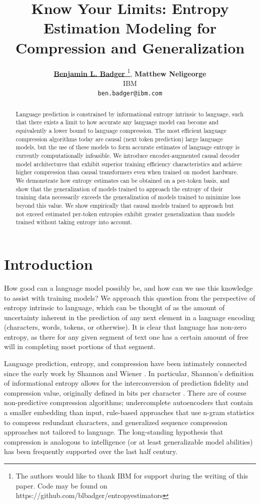\documentclass{article}
\title{\textbf{Know Your Limits: Entropy Estimation Modeling for Compression and Generalization}}
\author{\small \href{https://orcid.org/0000-0003-1661-4579}{\color{black} \textbf{Benjamin L. Badger} \thanks{The authors would like to thank IBM for support during the writing of this paper. Code may be found on \url{https://github.com/blbadger/entropyestimators}}, \href{https://orcid.org/0000-0002-7028-4569}{\color{black} \hspace{1mm} \textbf{Matthew Neligeorge}}} \\
	\small{IBM} \\
	\small{\texttt{ben.badger@ibm.com}} \\
}
\date{}
\begin{document}
\maketitle

\begin{abstract}\normalsize{
    Language prediction is constrained by informational entropy intrinsic to language, such that there exists a limit to how accurate any language model can become and equivalently a lower bound to language compression. The most efficient language compression algorithms today are causal (next token prediction) large language models, but the use of these models to form accurate estimates of language entropy is currently computationally infeasible. We introduce encoder-augmented causal decoder model architectures that exhibit superior training efficiency characteristics and achieve higher compression than causal transformers even when trained on modest hardware. We demonstrate how entropy estimates can be obtained on a per-token basis, and show that the generalization of models trained to approach the entropy of their training data necessarily exceeds the generalization of models trained to minimize loss beyond this value. We show empirically that causal models trained to approach but not exceed estimated per-token entropies exhibit greater generalization than models trained without taking entropy into account.}
\end{abstract}

\section{Introduction}

    How good can a language model possibly be, and how can we use this knowledge to assist with training models? We approach this question from the perspective of entropy intrinsic to language, which can be thought of as the amount of uncertainty inherent in the prediction of any next element in a language encoding (characters, words, tokens, or otherwise). It is clear that language has non-zero entropy, as there for any given segment of text one has a certain amount of free will in completing most portions of that segment.

    Language prediction, entropy, and compression have been intimately connected since the early work by Shannon \citep{shannon1948mathematical} and Wiener \citep{wiener2019cybernetics}. In particular, Shannon's definition of informational entropy allows for the interconversion of prediction fidelity and compression value, originally defined in bits per character \citep{shannon1951prediction}. There are of course non-predictive compression algorithms; undercomplete autoencoders that contain a smaller embedding than input, rule-based approaches that use n-gram statistics to compress redundant characters, and generalized sequence compression approaches not tailored to language. The long-standing hypothesis that compression is analogous to intelligence (or at least generalizable model abilities) has been frequently supported over the last half century. 
\end{document}
